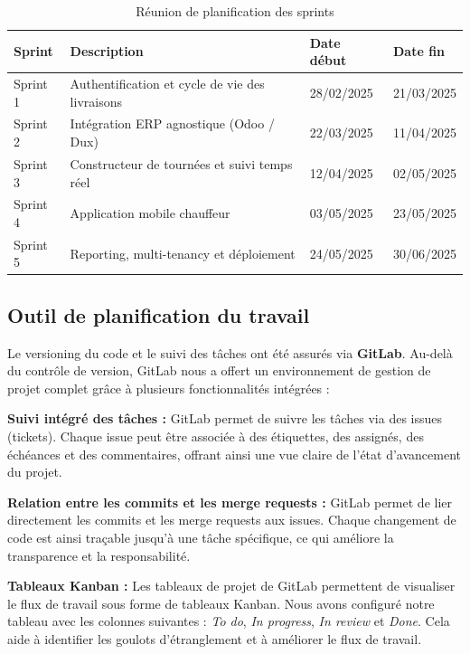 \begin{table}[H]
\centering
\caption{Réunion de planification des sprints}
\begin{tabularx}{\textwidth}{|C{1.5cm}|X|C{2.4cm}|C{2.4cm}|}
\hline
{}
\textbf{Sprint} & \textbf{Description} & \textbf{Date début} & \textbf{Date fin} \\
\hline
Sprint 1 & Authentification et cycle de vie des livraisons & 28/02/2025 & 21/03/2025 \\
\hline
Sprint 2 & Intégration ERP agnostique (Odoo / Dux) & 22/03/2025 & 11/04/2025 \\
\hline
Sprint 3 & Constructeur de tournées et suivi temps réel & 12/04/2025 & 02/05/2025 \\
\hline
Sprint 4 & Application mobile chauffeur & 03/05/2025 & 23/05/2025 \\
\hline
Sprint 5 & Reporting, multi-tenancy et déploiement & 24/05/2025 & 30/06/2025 \\
\hline
\end{tabularx}
\end{table}

\subsection{Outil de planification du travail}

Le versioning du code et le suivi des tâches ont été assurés via \textbf{GitLab}.
Au-delà du contrôle de version, GitLab nous a offert un environnement de gestion
de projet complet grâce à plusieurs fonctionnalités intégrées :

\textbf{Suivi intégré des tâches :} GitLab permet de suivre les tâches via des issues
(tickets). Chaque issue peut être associée à des étiquettes, des assignés, des échéances et
des commentaires, offrant ainsi une vue claire de l'état d'avancement du projet.

\textbf{Relation entre les commits et les merge requests :} GitLab permet de lier
directement les commits et les merge requests aux issues. Chaque changement de code est
ainsi traçable jusqu'à une tâche spécifique, ce qui améliore la transparence et la
responsabilité.

\textbf{Tableaux Kanban :} Les tableaux de projet de GitLab permettent de visualiser
le flux de travail sous forme de tableaux Kanban. Nous avons configuré notre tableau avec
les colonnes suivantes : \textit{To do}, \textit{In progress}, \textit{In review} et
\textit{Done}. Cela aide à identifier les goulots d'étranglement et à améliorer le flux
de travail.

